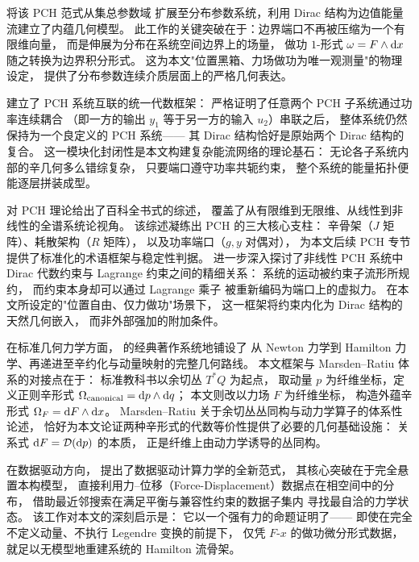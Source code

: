 ﻿\documentclass[10pt,a4paper]{article}
\numberwithin{equation}{section}
\begin{document}
\textcite{VanDerSchaftMaschke2002} 将该 PCH 范式从集总参数域
扩展至分布参数系统，利用 Dirac 结构为边值能量流建立了内蕴几何模型。
此工作的关键突破在于：边界端口不再被压缩为一个有限维向量，
而是伸展为分布在系统空间边界上的场量，
做功 $1$-形式 $\omega = F \wedge \text dx$ 随之转换为边界积分形式。
这为本文"位置黑箱、力场做功为唯一观测量"的物理设定，
提供了分布参数连续介质层面上的严格几何表达。

\textcite{CerveraVanDerSchaftBanos2007} 建立了 PCH 系统互联的统一代数框架：
严格证明了任意两个 PCH 子系统通过功率连续耦合
（即一方的输出 $y_1$ 等于另一方的输入 $u_2$）串联之后，
整体系统仍然保持为一个良定义的 PCH 系统——
其 Dirac 结构恰好是原始两个 Dirac 结构的复合。
这一模块化封闭性是本文构建复杂能流网络的理论基石：
无论各子系统内部的辛几何多么错综复杂，
只要端口遵守功率共轭约束，
整个系统的能量拓扑便能逐层拼装成型。

\textcite{VanDerSchaftJeltsema2014} 对 PCH 理论给出了百科全书式的综述，
覆盖了从有限维到无限维、从线性到非线性的全谱系统论视角。
该综述凝练出 PCH 的三大核心支柱：
辛骨架（$J$ 矩阵）、耗散架构（$R$ 矩阵），
以及功率端口（$g, y$ 对偶对），
为本文后续 PCH 专节提供了标准化的术语框架与稳定性判据。
\textcite{VanDerSchaftMaschke2020} 进一步深入探讨了非线性 PCH 系统中
Dirac 代数约束与 Lagrange 约束之间的精细关系：
系统的运动被约束子流形所规约，
而约束本身却可以通过 Lagrange 乘子
被重新编码为端口上的虚拟力。
在本文所设定的"位置自由、仅力做功"场景下，
这一框架将约束内化为 Dirac 结构的天然几何嵌入，
而非外部强加的附加条件。

在标准几何力学方面，\textcite{MarsdenRatiu1994} 的经典著作系统地铺设了
从 Newton 力学到 Hamilton 力学、再递进至辛约化与动量映射的完整几何路线。
本文框架与 Marsden--Ratiu 体系的对接点在于：
标准教科书以余切丛 $T^*Q$ 为起点，
取动量 $p$ 为纤维坐标，定义正则辛形式
$\Omega_{\text{canonical}} = \text dp \wedge \text dq$；
本文则改以力场 $F$ 为纤维坐标，
构造外蕴辛形式 $\Omega_F = \text dF \wedge \text dx$。
Marsden--Ratiu 关于余切丛丛同构与动力学算子的体系性论述，
恰好为本文论证两种辛形式的代数等价性提供了必要的几何基础设施：
关系式 $\text dF = \mathcal D(\text dp)$ 的本质，
正是纤维上由动力学诱导的丛同构。

在数据驱动方向，\textcite{KirchdoerferOrtiz2016} 提出了数据驱动计算力学的全新范式，
其核心突破在于完全悬置本构模型，
直接利用力--位移（Force-Displacement）数据点在相空间中的分布，
借助最近邻搜索在满足平衡与兼容性约束的数据子集内
寻找最自洽的力学状态。
该工作对本文的深刻启示是：
它以一个强有力的命题证明了——
即使在完全不定义动量、不执行 Legendre 变换的前提下，
仅凭 $F\text{-}x$ 的做功微分形式数据，
就足以无模型地重建系统的 Hamilton 流骨架。
\end{document}
